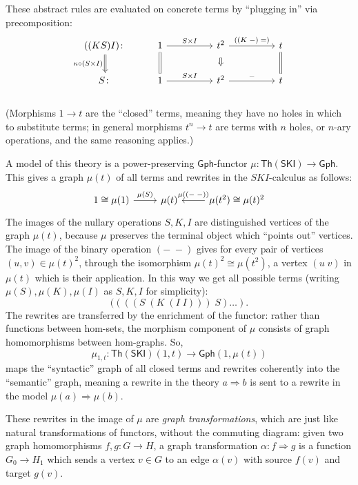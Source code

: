 \documentclass{amsart}
\theoremstyle{definition}
\newcommand{\Th}{\mathsf{Th}}
\newcommand{\Gph}{\mathsf{Gph}}
\newcommand{\maps}{\colon}
\begin{document}
These abstract rules are evaluated on concrete terms by ``plugging in'' via precomposition:
\[\begin{tikzcd}
	((KS)I)\maps \arrow[Rightarrow,d,swap,"\kappa \circ (S\times I)"] & 1 \arrow[d,equal] \arrow[rr,"S\times I"] && t^2 \arrow[Rightarrow,d,shorten >=0.2cm,shorten <=0.2cm] \arrow[rr,"((K\; -)\; =)"] && t \arrow[d,equal]\\
	S\maps & 1 \arrow[rr,"S\times I"] && t^2 \arrow[rr,"-"] && t
\end{tikzcd}\]\\
(Morphisms $1\to t$ are the ``closed'' terms, meaning they have no holes in which to substitute terms; in general morphisms $t^n\to t$ are terms with $n$ holes, or $n$-ary operations, and the same reasoning applies.)

A model of this theory is a power-preserving $\Gph$-functor $\mu\maps \Th(\mathsf{SKI}) \to \Gph$. This gives a graph $\mu(t)$ of all terms and rewrites in the $SKI$-calculus as follows:
\[\begin{tikzcd}
1 \cong \mu(1) \arrow[r,"\mu(S)"] & \mu(t) & \mu(t^2) \arrow[l,swap,"\mu(\left(-\;-\right))"] \cong \mu(t)^2
\end{tikzcd}\]
The images of the nullary operations $S,K,I$ are distinguished vertices of the graph $\mu(t)$, because $\mu$ preserves the terminal object which ``points out'' vertices. The image of the binary operation $(-\; -)$ gives for every pair of vertices $(u,v) \in \mu(t)^2$, through the isomorphism $\mu(t)^2 \cong \mu(t^2)$, a vertex $(u\; v)$ in $\mu(t)$ which is their application. In this way we get all possible terms (writing $\mu(S),\mu(K),\mu(I)$ as $S,K,I$ for simplicity): 
\[  ((((S\; (K\; (I\; I)))\; S) \dots ). \]
The rewrites are transferred by the enrichment of the functor: rather than functions between hom-sets, the morphism component of $\mu$ consists of graph homomorphisms between hom-graphs. So, $$\mu_{1,t}\maps \Th(\mathsf{SKI})(1,t)\to \Gph(1,\mu(t))$$ maps the ``syntactic'' graph of all closed terms and rewrites coherently into the ``semantic'' graph, meaning a rewrite in the theory $a\Rightarrow b$ is sent to a rewrite in the model $\mu(a) \Rightarrow \mu(b)$.

These rewrites in the image of $\mu$ are \textit{graph transformations}, which are just like natural transformations of functors, without the commuting diagram: given two graph homomorphisms $f,g\maps G\to H$, a graph transformation $\alpha\maps f \Rightarrow g$ is a function $G_0\to H_1$ which sends a vertex $v\in G$ to an edge $\alpha(v)$ with source $f(v)$ and target $g(v)$.
\end{document}
